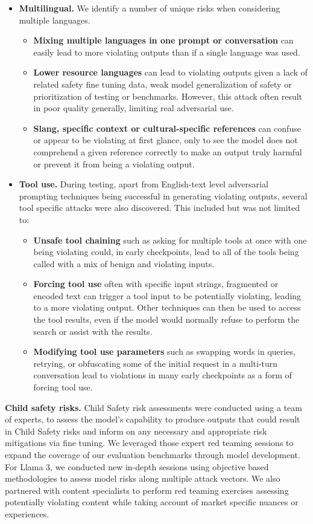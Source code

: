 \begin{itemize}
    \item \textbf{Multilingual.} We identify a number of unique risks when considering multiple languages.
    \begin{itemize}
        \item \textbf{Mixing multiple languages in one prompt or conversation} can easily lead to more violating outputs than if a single language was used.
        \item \textbf{Lower resource languages} can lead to violating outputs given a lack of related safety fine tuning data, weak model generalization of safety or prioritization of testing or benchmarks. However, this attack often result in poor quality generally, limiting real adversarial use.
        \item \textbf{Slang, specific context or cultural-specific references} can confuse or appear to be violating at first glance, only to see the model does not comprehend a given reference correctly to make an output truly harmful or prevent it from being a violating output.
    \end{itemize}

    \item \textbf{Tool use.} During testing, apart from English-text level adversarial prompting techniques being successful in generating violating outputs, several tool specific attacks were also discovered. This included but was not limited to:
    \begin{itemize}
        \item \textbf{Unsafe tool chaining} such as asking for multiple tools at once with one being violating could, in early checkpoints, lead to all of the tools being called with a mix of benign and violating inputs.
        \item \textbf{Forcing tool use} often with specific input strings, fragmented or encoded text can trigger a tool input to be potentially violating, leading to a more violating output. Other techniques can then be used to access the tool results, even if the model would normally refuse to perform the search or assist with the results.
        \item \textbf{Modifying tool use parameters} such as swapping words in queries, retrying, or obfuscating some of the initial request in a multi-turn conversation lead to violations in many early checkpoints as a form of forcing tool use.
    \end{itemize}
\end{itemize}

\textbf{Child safety risks.} Child Safety risk assessments were conducted using a team of experts, to assess the model’s capability to produce outputs that could result in Child Safety risks and inform on any necessary and appropriate risk mitigations via fine tuning. We leveraged those expert red teaming sessions to expand the coverage of our evaluation benchmarks through model development. For Llama 3, we conducted new in-depth sessions using objective based methodologies to assess model risks along multiple attack vectors. We also partnered with content specialists to perform red teaming exercises assessing potentially violating content while taking account of market specific nuances or experiences.

